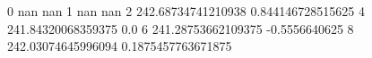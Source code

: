 0 nan nan
1 nan nan
2 242.68734741210938 0.844146728515625
4 241.84320068359375 0.0
6 241.28753662109375 -0.5556640625
8 242.03074645996094 0.1875457763671875
